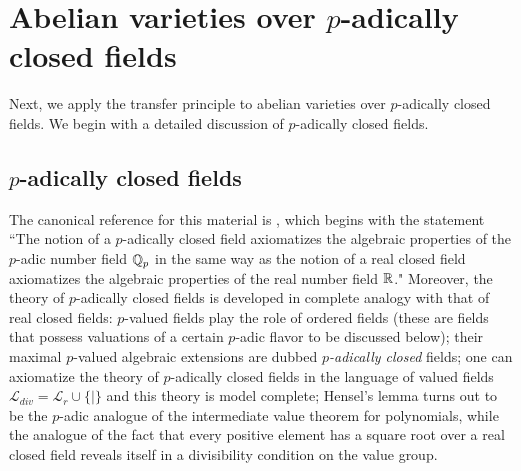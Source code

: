 

\chapter{Abelian varieties over $p$-adically closed fields}

%

Next, we apply the transfer principle to abelian varieties over $p$-adically closed fields. We begin with a detailed discussion of $p$-adically closed fields.

\section{$p$-adically closed fields}

The canonical reference for this material is \cite{formallyp-adic}, which begins with the statement ``The notion of a $p$-adically closed field axiomatizes the algebraic properties of the $p$-adic number field $\mathbb{Q}_p$ in the same way as the notion of a real closed field axiomatizes the algebraic properties of the real number field $\mathbb{R}$." Moreover, the theory of $p$-adically closed fields is developed in complete analogy with that of real closed fields: $p$-valued fields play the role of ordered fields (these are fields that possess valuations of a certain $p$-adic flavor to be discussed below); their maximal $p$-valued algebraic extensions are dubbed \emph{$p$-adically closed} fields; one can axiomatize the theory of $p$-adically closed fields in the language of valued fields $\mathcal{L}_{div}=\mathcal{L}_r\cup\{\mid\}$ and this theory is model complete; Hensel's lemma turns out to be the $p$-adic analogue of the intermediate value theorem for polynomials, while the analogue of the fact that every positive element has a square root over a real closed field reveals itself in a divisibility condition on the value group.

